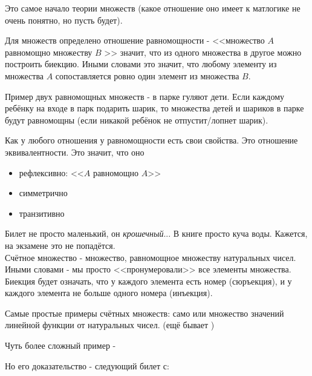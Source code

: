 
Это самое начало теории множеств (какое отношение оно имеет к матлогике не очень понятно, но  пусть будет).


Для множеств определено отношение равномощности 
	- <<множество $A$ равномощно множеству $B$ >> значит, что из одного множества в другое можно построить биекцию.
Иными словами это значит, что любому элементу из множества $A$ сопоставляется ровно один элемент из множества $B$.

Пример двух равномощных множеств 
	- в парке гуляют дети. Если каждому ребёнку на входе в парк подарить шарик, то множества детей и шариков в парке будут равномощны (если никакой ребёнок не отпустит/лопнет шарик).
	
Как у любого отношения у равномощности есть свои свойства.
Это отношение эквивалентности.
Это значит, что оно \begin{itemize}
		    	\item
		    		рефлексивно: <<$A$ равномощно $A$>>
		    	\item
		    		симметрично
		    	\item
		    		транзитивно 
		    \end{itemize}


Билет не просто маленький, он \textit{крошечный}... В книге просто куча воды. Кажется, на экзамене это не попадётся. \\


Счётное множество - множество, равномощное множеству натуральных чисел.
Иными словами - мы просто <<пронумеровали>> все элементы множества.
Биекция будет означать, что у каждого элемента есть номер (сюръекция), и у каждого элемента не больше одного номера (инъекция).


Самые простые примеры счётных множеств: само \N или множество значений линейной функции от натуральных чисел. (ещё бывает \Z)

Чуть более сложный пример - \Q 

Но его доказательство - следующий билет с: 


